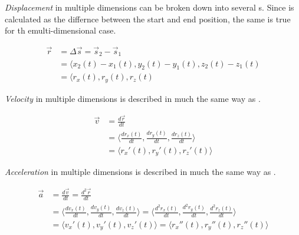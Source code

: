 \begin{definition}\label{Multi-D Displacement}
  \emph{Displacement} in multiple dimensions can be broken down into several s.
  Since  is calculated as the differnce between the start and end position, the same is true for th emulti-dimensional case.

  \begin{equation}\label{eq:Multi-D Displacement}
    \begin{aligned}
      \vec{r} &= \Delta \vec{s} = \vec{s}_{2} - \vec{s}_{1} \\
      &= \langle x_{2}(t)-x_{1}(t), y_{2}(t)-y_{1}(t), z_{2}(t)-z_{1}(t) \\
      &= \langle r_{x}(t), r_{y}(t), r_{z}(t)
    \end{aligned}
  \end{equation}
\end{definition}

\begin{definition}\label{Multi-D Velocity}
  \emph{Velocity} in multiple dimensions is described in much the same way as .

  \begin{equation}\label{eq:Multi-D Velocity}
    \begin{aligned}
      \vec{v} &= \frac{d \vec{r}}{dt} \\
      &= \biggl \langle \frac{d r_{x}(t)}{dt}, \frac{d r_{y}(t)}{dt}, \frac{d r_{z}(t)}{dt} \biggr \rangle \\
      &= \bigl \langle r_{x}'(t), r_{y}'(t), r_{z}'(t) \bigr \rangle
    \end{aligned}
  \end{equation}
\end{definition}

\begin{definition}\label{Multi-D Acceleration}
  \emph{Acceleration} in multiple dimensions is described in much the same way as .

  \begin{equation}\label{eq:Multi-D Acceleration}
    \begin{aligned}
      \vec{a} &= \frac{d \vec{v}}{dt} = \frac{d^{2} \vec{r}}{dt} \\
      &= \biggl \langle \frac{d v_{x}(t)}{dt}, \frac{d v_{y}(t)}{dt}, \frac{d v_{z}(t)}{dt} \biggr \rangle = \biggl \langle \frac{d^{2} r_{x}(t)}{dt}, \frac{d^{2} r_{y}(t)}{dt}, \frac{d^{2} r_{z}(t)}{dt} \biggr \rangle \\
      &= \bigl \langle v_{x}'(t), v_{y}'(t), v_{z}'(t) \bigr \rangle = \bigl \langle r_{x}''(t), r_{y}''(t), r_{z}''(t) \bigr \rangle
    \end{aligned}
  \end{equation}
\end{definition}

